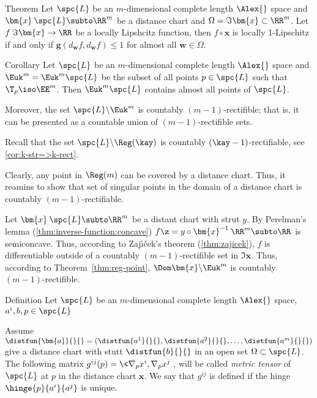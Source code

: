 \begin{thm}{Theorem}
Let $\spc{L}$ be an $m$-dimensional complete length $\Alex{}$ space and $\bm{x}\:\spc{L}\subto\RR^m$ be a distance chart and $\Omega=\Im\bm{x}\subset\RR^m$. 
Let $f\:\Im\bm{x}\to\RR$ be a locally Lipshcitz function,
then $f\circ\bm{x}$ is locally 1-Lipschitz if and only if
$\bm{g}(d_{\bm{w}}f,d_{\bm{w}}f)\le 1$ for almost all $\bm{w}\in\Omega$.
\end{thm}




\begin{thm}{Corollary}
Let $\spc{L}$ be an $m$-dimensional complete length $\Alex{}$ space and $\Euk^m=\Euk^m\spc{L}$ be the subset of all points $p\in \spc{L}$ such that $\T_p\iso\EE^m$. 
Then $\Euk^m\spc{L}$ contains almost all points of $\spc{L}$.

Moreover, the set 
$\spc{L}\backslash\Euk^m$ is countably $(m-1)$-rectifible;
that is, it can be presented as a countable union of $(m-1)$-rectifible sets.
\end{thm}

Recall that the set $\spc{L}\backslash\Reg(\kay)$ is countably $(\kay-1)$-rectifiable, see \ref{cor:k-str=>k-rect}.

Clearly, any point in $\Reg(m)$ can be covered by a distance chart. 
Thus, it reamins to show that set of singular points in the domain of a distance chart is countably $(m-1)$-rectifiable.

Let $\bm{x}\:\spc{L}\subto\RR^m$ be a distant chart with strut $y$.
By Perelman's lemma (\ref{thm:inverse-function:concave}) $f\z=y\circ\bm{x}^{-1}\:\RR^m\subto \RR$ is semiconcave.
Thus, according to Zaj\'{\i}\v{c}ek's theorem (\ref{thm:zajicek}),
$f$ is differentiable outside of a countably $(m-1)$-rectifible set in $\Im \bm{x}$.
Thus, according to Theorem~\ref{thm:reg-point}, 
$\Dom\bm{x}\backslash\Euk^m$ is countably $(m-1)$-rectifible.
\qeds



\begin{thm}{Definition}
Let $\spc{L}$ be an $m$-dimensional complete length $\Alex{}$ space, $a^i,b,p\in\spc{L}$

Assume $\distfun{\bm{a}}{}{}=(\distfun{a^1}{}{},\distfun{a^2}{}{},\dots,\distfun{a^m}{}{})$ 
give a distance chart with stutt $\distfun{b}{}{}$
in an open set $\Omega\subset\spc{L}$.
The following matrix 
$g^{ij}(p)=\<\nabla_p x^i,\nabla_p x^j\>$,
will be called \emph{metric tensor} of $\spc{L}$
at $p$ in the distance chart $\bm{x}$.
We say that $g^{ij}$ is defined if the hinge $\hinge{p}{a^i}{a^j}$ is unique.
\end{thm}


